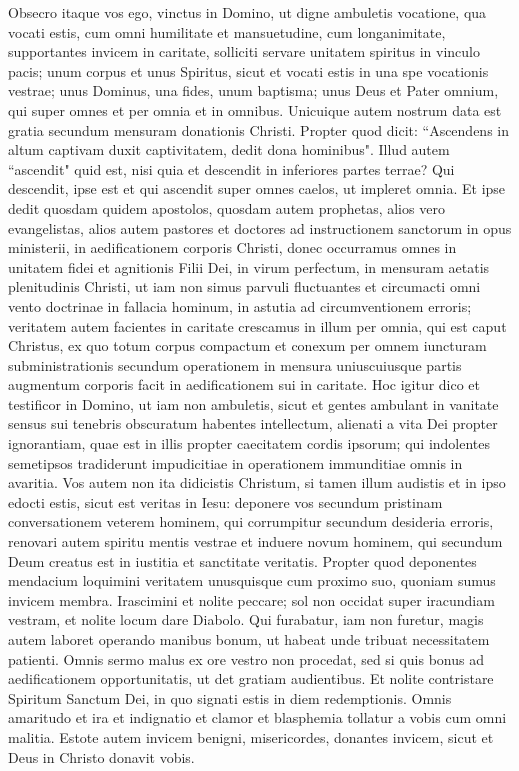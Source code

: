 \begin{biblechapter}  
\verse Obsecro itaque vos ego, vinctus in Domino, ut digne ambuletis vocatione, qua vocati estis, 
\verse cum omni humilitate et mansuetudine, cum longanimitate, supportantes invicem in caritate, 
\verse solliciti servare unitatem spiritus in vinculo pacis; 
\verse unum corpus et unus Spiritus, sicut et vocati estis in una spe vocationis vestrae; 
\verse unus Dominus, una fides, unum baptisma; 
\verse unus Deus et Pater omnium, qui super omnes et per omnia et in omnibus. 
\verse Unicuique autem nostrum data est gratia secundum mensuram donationis Christi. 
\verse Propter quod dicit: “Ascendens in altum captivam duxit captivitatem, dedit dona hominibus". 
\verse Illud autem “ascendit" quid est, nisi quia et descendit in inferiores partes terrae? 
\verse Qui descendit, ipse est et qui ascendit super omnes caelos, ut impleret omnia. 
\verse Et ipse dedit quosdam quidem apostolos, quosdam autem prophetas, alios vero evangelistas, alios autem pastores et doctores 
\verse ad instructionem sanctorum in opus ministerii, in aedificationem corporis Christi, 
\verse donec occurramus omnes in unitatem fidei et agnitionis Filii Dei, in virum perfectum, in mensuram aetatis plenitudinis Christi, 
\verse ut iam non simus parvuli fluctuantes et circumacti omni vento doctrinae in fallacia hominum, in astutia ad circumventionem erroris; 
\verse veritatem autem facientes in caritate crescamus in illum per omnia, qui est caput Christus, 
\verse ex quo totum corpus compactum et conexum per omnem iuncturam subministrationis secundum operationem in mensura uniuscuiusque partis augmentum corporis facit in aedificationem sui in caritate. 
\verse Hoc igitur dico et testificor in Domino, ut iam non ambuletis, sicut et gentes ambulant in vanitate sensus sui 
\verse tenebris obscuratum habentes intellectum, alienati a vita Dei propter ignorantiam, quae est in illis propter caecitatem cordis ipsorum; 
\verse qui indolentes semetipsos tradiderunt impudicitiae in operationem immunditiae omnis in avaritia. 
\verse Vos autem non ita didicistis Christum, 
\verse si tamen illum audistis et in ipso edocti estis, sicut est veritas in Iesu: 
\verse deponere vos secundum pristinam conversationem veterem hominem, qui corrumpitur secundum desideria erroris, 
\verse renovari autem spiritu mentis vestrae 
\verse et induere novum hominem, qui secundum Deum creatus est in iustitia et sanctitate veritatis.  
\verse Propter quod deponentes mendacium loquimini veritatem unusquisque cum proximo suo, quoniam sumus invicem membra. 
\verse Irascimini et nolite peccare; sol non occidat super iracundiam vestram, 
\verse et nolite locum dare Diabolo. 
\verse Qui furabatur, iam non furetur, magis autem laboret operando manibus bonum, ut habeat unde tribuat necessitatem patienti. 
\verse Omnis sermo malus ex ore vestro non procedat, sed si quis bonus ad aedificationem opportunitatis, ut det gratiam audientibus. 
\verse Et nolite contristare Spiritum Sanctum Dei, in quo signati estis in diem redemptionis. 
\verse Omnis amaritudo et ira et indignatio et clamor et blasphemia tollatur a vobis cum omni malitia. 
\verse Estote autem invicem benigni, misericordes, donantes invicem, sicut et Deus in Christo donavit vobis. 
\end{biblechapter}

